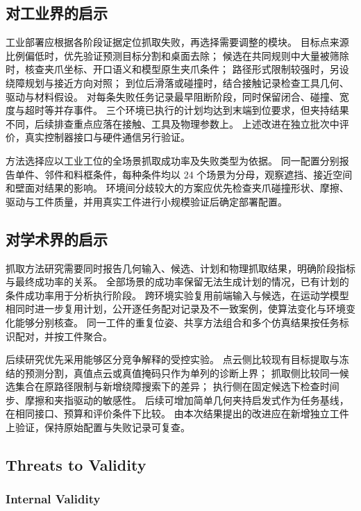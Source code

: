 \documentclass[UTF8,fontset=fandol,a4paper,11pt]{ctexart}
\newcommand{\qyb}[1]{\textcolor{red!75!black}{#1}}
\begin{document}
\subsection{\qyb{对工业界的启示}}

工业部署应根据各阶段证据定位抓取失败，再选择需要调整的模块。
目标点来源比例偏低时，优先验证预测目标分割和桌面去除；
候选在共同规则中大量被筛除时，核查夹爪坐标、开口语义和模型原生夹爪条件；
路径形式限制较强时，另设绕障规划与接近方向对照；
到位后滑落或碰撞时，结合接触记录检查工具几何、驱动与材料假设。
对每条失败任务记录最早阻断阶段，同时保留闭合、碰撞、宽度与超时等并存事件。
三个环境已执行的计划均达到末端到位要求，但夹持结果不同，后续排查重点应落在接触、工具及物理参数上。
上述改进在独立批次中评价，真实控制器接口与硬件通信另行验证。

方法选择应以工业工位的全场景抓取成功率及失败类型为依据。
同一配置分别报告单件、邻件和料框条件，每种条件均以 24 个场景为分母，观察遮挡、接近空间和壁面对结果的影响。
环境间分歧较大的方案应优先检查夹爪碰撞形状、摩擦、驱动与工件质量，并用真实工件进行小规模验证后确定部署配置。

\subsection{\qyb{对学术界的启示}}

抓取方法研究需要同时报告几何输入、候选、计划和物理抓取结果，明确阶段指标与最终成功率的关系。
全部场景的成功率保留无法生成计划的情况，已有计划的条件成功率用于分析执行阶段。
跨环境实验复用前端输入与候选，在运动学模型相同时进一步复用计划，公开逐任务配对记录及不一致案例，使算法变化与环境变化能够分别核查。
同一工件的重复位姿、共享方法组合和多个仿真结果按任务标识配对，并按工件聚合。

后续研究优先采用能够区分竞争解释的受控实验。
点云侧比较现有目标提取与冻结的预测分割，真值点云或真值掩码只作为单列的诊断上界；
抓取侧比较同一候选集合在原路径限制与新增绕障搜索下的差异；
执行侧在固定候选下检查时间步、摩擦和夹指驱动的敏感性。
后续可增加简单几何夹持启发式作为任务基线，在相同接口、预算和评价条件下比较。
由本次结果提出的改进应在新增独立工件上验证，保持原始配置与失败记录可复查。

\subsection{\qyb{Threats to Validity}}
\label{sec:threats}

\subsubsection{Internal Validity}
\end{document}
